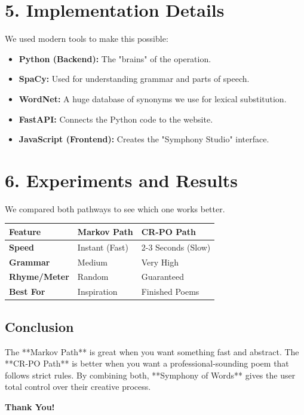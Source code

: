 \documentclass[12pt, a4paper]{article}
\begin{document}
\newpage

\section{5. Implementation Details}
We used modern tools to make this possible:
\begin{itemize}
    \item \textbf{Python (Backend):} The "brains" of the operation.
    \item \textbf{SpaCy:} Used for understanding grammar and parts of speech.
    \item \textbf{WordNet:} A huge database of synonyms we use for lexical substitution.
    \item \textbf{FastAPI:} Connects the Python code to the website.
    \item \textbf{JavaScript (Frontend):} Creates the "Symphony Studio" interface.
\end{itemize}

\section{6. Experiments and Results}
We compared both pathways to see which one works better.

\begin{tcolorbox}[title=Final Comparison Table]
\renewcommand{\arraystretch}{1.5}
\begin{tabularx}{\textwidth}{l X X}
    \rowcolor{tableheader} \textbf{Feature} & \textbf{Markov Path} & \textbf{CR-PO Path} \\
    \midrule
    \textbf{Speed} & Instant (Fast) & 2-3 Seconds (Slow) \\
    \textbf{Grammar} & Medium & Very High \\
    \textbf{Rhyme/Meter} & Random & Guaranteed \\
    \textbf{Best For} & Inspiration & Finished Poems \\
    \bottomrule
\end{tabularx}
\end{tcolorbox}

\subsection{Conclusion}
The **Markov Path** is great when you want something fast and abstract. The **CR-PO Path** is better when you want a professional-sounding poem that follows strict rules. By combining both, **Symphony of Words** gives the user total control over their creative process.

\begin{center}
    \vspace{2cm}
    \color{accent} \Huge \textbf{Thank You!}
\end{center}
\end{document}
